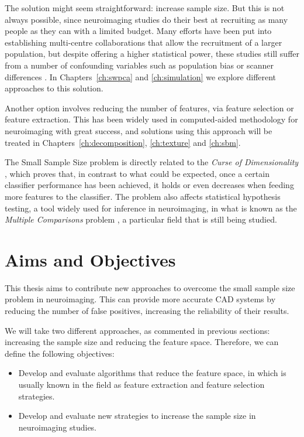The solution might seem straightforward: increase sample size. But this is not always possible, since neuroimaging studies do their best at recruiting as many people as they can with a limited budget. Many efforts have been put into establishing multi-centre collaborations that allow the recruitment of a larger population, but despite offering a higher statistical power, these studies still suffer from a number of confounding variables such as population bias or scanner differences \cite{haar2014anatomical}. In Chapters~\ref{ch:swpca} and \ref{ch:simulation} we explore different approaches to this solution. 

Another option involves reducing the number of features, via feature selection or feature extraction. This has been widely used in computed-aided methodology for neuroimaging \cite{DeMartino2007,xu2009source,Gorriz2010,Illan2011,Martinez-Murcia2016} with great success, and solutions using this approach will be treated in Chapters~\ref{ch:decomposition}, \ref{ch:texture} and \ref{ch:sbm}. 

The Small Sample Size problem is directly related to the \textit{Curse of Dimensionality} \cite{Krishnaiah1982}, which proves that, in contrast to what could be expected, once a certain classifier performance has been achieved, it holds or even decreases when feeding more features to the classifier. The problem also affects statistical hypothesis testing, a tool widely used for inference in neuroimaging, in what is known as the \textit{Multiple Comparisons} problem \cite{Benjamini2010}, a particular field that is still being studied. 

\section{Aims and Objectives}\label{sec:overview}
This thesis aims to contribute new approaches to overcome the small sample size problem in neuroimaging. This can provide more accurate \ac{CAD} systems by reducing the number of false positives, increasing the reliability of their results. 

We will take two different approaches, as commented in previous sections: increasing the sample size and reducing the feature space. Therefore, we can define the following objectives: 

\begin{itemize}
	\item Develop and evaluate algorithms that reduce the feature space, in which is usually known in the field as feature extraction and feature selection strategies. 
	\item Develop and evaluate new strategies to increase the sample size in neuroimaging studies. 
\end{itemize}

